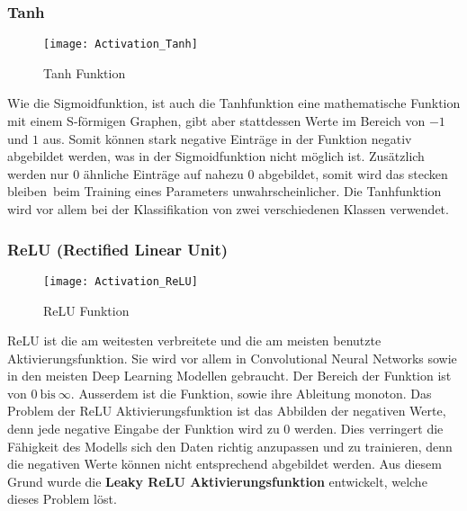 \subsubsection{Tanh}
\label{sub:activation-tanh}
\begin{figure}[H]
	\centering
	\texttt{[image: Activation\_Tanh]}
	\caption{Tanh Funktion}
	\label{fig:Activation-Tanh}
\end{figure}
\noindent
Wie die Sigmoidfunktion, ist auch die Tanhfunktion eine mathematische Funktion mit einem S-förmigen Graphen, gibt aber
stattdessen Werte im Bereich von $-1$ und $1$ aus. Somit können stark negative Einträge in der Funktion negativ
abgebildet werden, was in der Sigmoidfunktion nicht möglich ist. Zusätzlich werden nur $0$ ähnliche Einträge auf nahezu
$0$ abgebildet, somit wird das \flqq stecken bleiben\frqq \ beim Training eines Parameters unwahrscheinlicher.
\newline
Die Tanhfunktion wird vor allem bei der Klassifikation von zwei verschiedenen Klassen verwendet.

\subsubsection{ReLU (Rectified Linear Unit)}
\label{sub:activation-relu}
\begin{figure}[H]
	\centering
	\texttt{[image: Activation\_ReLU]}
	\caption{ReLU Funktion}
	\label{fig:Activation-Relu}
\end{figure}
\noindent
ReLU ist die am weitesten verbreitete und die am meisten benutzte Aktivierungsfunktion. Sie wird vor allem in
Convolutional Neural Networks sowie in den meisten Deep Learning Modellen gebraucht. Der Bereich der Funktion ist von $0
\ \text{bis} \ \infty$. Ausserdem ist die Funktion, sowie ihre Ableitung monoton.
\newline
Das Problem der ReLU Aktivierungsfunktion ist das Abbilden der negativen Werte, denn jede negative Eingabe der Funktion
wird zu $0$ werden. Dies verringert die Fähigkeit des Modells sich den Daten richtig anzupassen und zu trainieren, denn
die negativen Werte können nicht entsprechend abgebildet werden. Aus diesem Grund wurde die \textbf{Leaky ReLU
Aktivierungsfunktion} entwickelt, welche dieses Problem löst.

